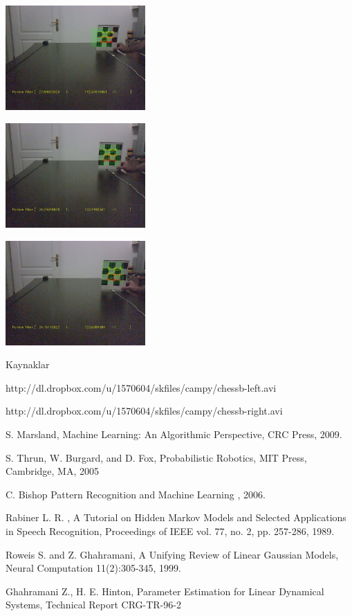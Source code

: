 \documentclass[12pt,fleqn]{article}\usepackage{../common}
\begin{document}
\includegraphics[height=4cm]{cb-pf-2.jpg}

\includegraphics[height=4cm]{cb-pf-3.jpg}

\includegraphics[height=4cm]{cb-pf-4.jpg}

Kaynaklar

http://dl.dropbox.com/u/1570604/skfiles/campy/chessb-left.avi

http://dl.dropbox.com/u/1570604/skfiles/campy/chessb-right.avi

S. Marsland, Machine Learning: An Algorithmic Perspective, CRC Press,
2009.

S. Thrun, W. Burgard, and D. Fox, Probabilistic Robotics, MIT Press,
Cambridge, MA, 2005

C. Bishop Pattern Recognition and Machine Learning , 2006.

Rabiner L. R. , A Tutorial on Hidden Markov Models and Selected
Applications in Speech Recognition, Proceedings of IEEE vol. 77, no. 2,
pp. 257-286, 1989.

Roweis S. and Z. Ghahramani, A Unifying Review of Linear Gaussian Models,
Neural Computation 11(2):305-345, 1999.

Ghahramani Z., H. E. Hinton, Parameter Estimation for Linear Dynamical
Systems, Technical Report CRG-TR-96-2
\end{document}
